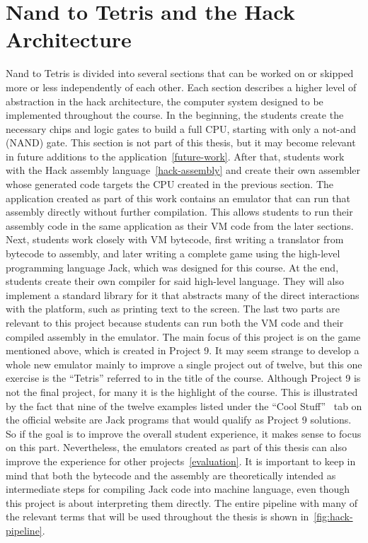 \section{Nand to Tetris and the Hack Architecture} \label{hack-architecture}
Nand to Tetris is divided into several sections that can be worked on or skipped more or less independently of each other.
Each section describes a higher level of abstraction in the hack architecture, the computer system designed to be implemented throughout the course.
In the beginning, the students create the necessary chips and logic gates to build a full CPU, starting with only a not-and (NAND) gate.
This section is not part of this thesis, but it may become relevant in future additions to the application~\ref{future-work}.
After that, students work with the Hack assembly language~\ref{hack-assembly} and create their own assembler whose generated code targets the CPU created in the previous section.
The application created as part of this work contains an emulator that can run that assembly directly without further compilation.
This allows students to run their assembly code in the same application as their VM code from the later sections.
Next, students work closely with VM bytecode, first writing a translator from bytecode to assembly, and later writing a complete game using the high-level programming language Jack, which was designed for this course.
At the end, students create their own compiler for said high-level language.
They will also implement a standard library for it that abstracts many of the direct interactions with the platform, such as printing text to the screen.
The last two parts are relevant to this project because students can run both the VM code and their compiled assembly in the emulator.
The main focus of this project is on the game mentioned above, which is created in Project 9.
It may seem strange to develop a whole new emulator mainly to improve a single project out of twelve, but this one exercise is the ``Tetris'' referred to in the title of the course.
Although Project 9 is not the final project, for many it is the highlight of the course.
This is illustrated by the fact that nine of the twelve examples listed under the ``Cool Stuff''~\cite{n2tweb} tab on the official website are Jack programs that would qualify as Project 9 solutions.
So if the goal is to improve the overall student experience, it makes sense to focus on this part.
Nevertheless, the emulators created as part of this thesis can also improve the experience for other projects~\ref{evaluation}.
It is important to keep in mind that both the bytecode and the assembly are theoretically intended as intermediate steps for compiling Jack code into machine language, even though this project is about interpreting them directly.
The entire pipeline with many of the relevant terms that will be used throughout the thesis is shown in~\cref{fig:hack-pipeline}.

